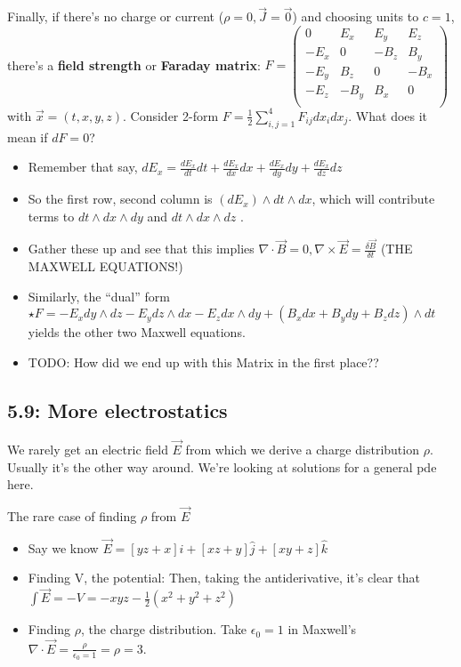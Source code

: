 \documentclass[11pt, oneside]{article}   	%
\begin{document}
Finally, if there's no charge or current ($\rho = 0, \vec{J} = \vec{0}$) and choosing units to $c=1$, there's a \textbf{field strength} or \textbf{Faraday matrix}:
$F = \begin{pmatrix}
0 & E_x& E_y& E_z \\
-E_x & 0 &  -B_z & B_y \\
-E_y & B_z & 0 &-B_x \\
-E_z & -B_y & B_x & 0 \\
\end{pmatrix}$
with $\vec{x} = (t,x,y,z).$  Consider 2-form $F = \frac{1}{2}\sum_{i,j = 1}^{4} F_{ij}dx_idx_j$.  What does it mean if $dF = 0$?
\begin{itemize}
\item Remember that say, $dE_x = \frac{d E_x}{dt} dt + \frac{d E_x}{dx} dx + \frac{d E_x}{dy} dy + \frac{d E_x}{dz} dz $
\item So the first row, second column is $(dE_x) \wedge dt \wedge dx$, which will contribute terms to $dt \wedge dx \wedge dy$ and $dt \wedge dx \wedge dz$ .
\item Gather these up and see that this implies $\nabla \cdot \vec{B} = 0, \nabla \times \vec{E} = \frac{\delta \vec{B}}{\delta t}$ (THE MAXWELL EQUATIONS!)
\item Similarly, the ``dual'' form $\star F = -E_xdy\wedge dz - E_ydz\wedge dx - E_zdx\wedge dy + (B_xdx+B_ydy+B_zdz)\wedge dt$ yields the other two Maxwell equations.
\item TODO: How did we end up with this Matrix in the first place??
\end{itemize}

\subsection{5.9: More electrostatics}

We rarely get an electric field $\vec{E}$ from which we derive a charge distribution $\rho$. Usually it's the other way around.
We're looking at solutions for a general pde here.

The rare case of finding $\rho$ from $\vec{E}$
\begin{itemize}
\item Say we know $\vec{E} = [yz + x]\hat{i} +  [xz + y]\hat{j} +  [xy + z]\hat{k}$
\item Finding V, the potential: Then, taking the antiderivative, it's clear that $\int \vec{E} = -V = -xyz - \frac{1}{2}(x^2 + y^2 + z^2)$
\item Finding $\rho$, the charge distribution.  Take $\epsilon_0 = 1$ in Maxwell's $\nabla \cdot \vec{E} = \frac{\rho}{\epsilon_0 = 1} = \rho = 3$.
\end{itemize}
\end{document}
